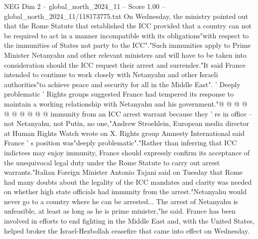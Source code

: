 \begin{textsample}{NEG Dim 2 – global\_north\_2024\_11 – Score 1.00 – global\_north\_2024\_11/118173775.txt}
On Wednesday, the ministry pointed out that the Rome Statute that established the ICC provided that a country can not be required to act in a manner incompatible with its obligations"with respect to the immunities of States not party to the ICC"."Such immunities apply to Prime Minister Netanyahu and other relevant ministers and will have to be taken into consideration should the ICC request their arrest and surrender."It said France intended to continue to work closely with Netanyahu and other Israeli authorities"to achieve peace and security for all in the Middle East". ' Deeply problematic ' Rights groups suggested France had tempered its response to maintain a working relationship with Netanyahu and his government."@ @ @ @ @ @ @ @ @ @ immunity from an ICC arrest warrant because they ' re in office -- not Netanyahu, not Putin, no one,"Andrew Stroehlein, European media director at Human Rights Watch wrote on X.
Rights group Amnesty International said France ' s position was"deeply problematic"."Rather than inferring that ICC indictees may enjoy immunity, France should expressly confirm its acceptance of the unequivocal legal duty under the Rome Statute to carry out arrest warrants."Italian Foreign Minister Antonio Tajani said on Tuesday that Rome had many doubts about the legality of the ICC mandates and clarity was needed on whether high state officials had immunity from the arrest."Netanyahu would never go to a country where he can be arrested...
The arrest of Netanyahu is unfeasible, at least as long as he is prime minister,"he said.
France has been involved in efforts to end fighting in the Middle East and, with the United States, helped broker the Israel-Hezbollah ceasefire that came into effect on Wednesday.

\end{textsample}
